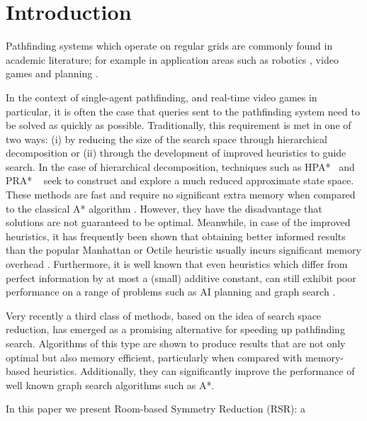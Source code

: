 \section{Introduction}
Pathfinding systems which operate on regular grids are commonly found in
academic literature; for example in application areas such as robotics 
\cite{choset05}, video games \cite{botea04,sturtevant05,bjornsson06} and 
planning \cite{DBLP:conf/aips/ThayerR09,DBLP:conf/aips/HernandezMSK09,DBLP:conf/aips/WangB08,DBLP:conf/aips/BulitkoBLSS07}.
\par
In the context of single-agent pathfinding, and real-time video games in particular, 
it is often the case that queries sent to the pathfinding system  need to be solved as quickly as possible.
Traditionally, this requirement is met in one of two ways: (i) by reducing the size of the search space through hierarchical 
decomposition or (ii) through the development of improved heuristics to guide search.
In the case of hierarchical decomposition, techniques such as
HPA*~\cite{botea04} and PRA* ~\cite{sturtevant05} seek to construct and explore
a much reduced approximate state space.
These methods are fast and require no significant extra memory when compared to the classical
A* algorithm \cite{hart68}.
However, they have the disadvantage that solutions are not guaranteed to be optimal.
Meanwhile, in case of the improved heuristics, it has frequently been shown
that obtaining better informed results than the popular
Manhattan or Octile heuristic usually incurs significant memory overhead 
\cite{sturtevant09,goldberg05,Cazenave:06,bjornsson06}.
Furthermore, it is well known that even heuristics which differ from perfect information 
by at most a (small) additive constant, can still exhibit poor performance on a range of 
problems such as AI planning and graph search \cite{helmert08,pohl77}.
\par
Very recently a third class of methods, based on the idea of search space
reduction, has emerged as a promising alternative for speeding up pathfinding
search.
Algorithms of this type \cite{bjornsson06,pochter10,harabor10} are shown to produce 
results that are not only optimal but also memory efficient, particularly when compared 
with memory-based heuristics.
Additionally, they can significantly improve the performance of well known graph
search algorithms such as A*.
\par
In this paper we present Room-based Symmetry Reduction (RSR): a
